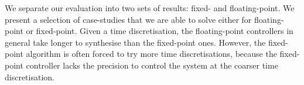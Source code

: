 We separate our evaluation into two sets of results: fixed- and floating-point. 
We present a selection of case-studies that we are able to solve either for floating-point or fixed-point. 
Given a time discretisation, the floating-point controllers in general take longer to synthesise
than the fixed-point ones. However, the fixed-point algorithm is often forced to try more time discretisations, because the fixed-point controller
lacks the precision to control the system at the coarser time discretisation.




